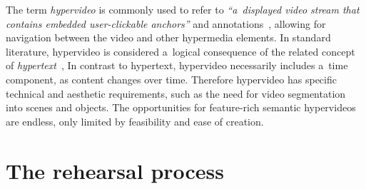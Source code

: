 \documentclass[conference]{IEEEtran}
\newcommand{\todo}[1]{\noindent\textcolor{red}{{\bf \{ToDo} #1{\bf \}}}}
\begin{document}
The term \emph{hypervideo} is commonly used to refer to
\textit{``a~displayed video stream that contains embedded user-clickable anchors''}
and annotations~\cite{sawhney1996hypercafe}, %
allowing for navigation between the video and other hypermedia elements.
In standard literature, hypervideo is considered a~logical consequence
of the related concept of \emph{hypertext}~\cite{bernerslee1990hypertext},
In contrast to hypertext, hypervideo necessarily includes a~time component,
as content changes over time. Therefore hypervideo has specific technical and aesthetic requirements, 
such as the need for video segmentation into scenes and  objects. The opportunities for feature-rich 
semantic hypervideos are endless, only limited by feasibility and ease of creation. 



\section{The rehearsal process}
\label{sec:context}
%
\end{document}
